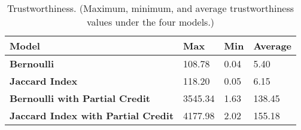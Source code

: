 \begin{table}[h!]
\centering
\footnotesize
{
\begin{tabular}{l|l|l|l}
\hline
Model                & Max     & Min & Average \\
\hline                            
{\bf Bernoulli}                    & 108.78   & 0.04 & 5.40 \\
{\bf Jaccard Index}                & 118.20   & 0.05 & 6.15 \\
{\bf Bernoulli with Partial Credit} & 3545.34  & 1.63 & 138.45 \\
{\bf Jaccard Index with Partial Credit} & 4177.98 & 2.02 & 155.18 \\
\hline
\end{tabular}
}
\caption{Trustworthiness. 
(Maximum, minimum, and average trustworthiness values under the four models.)
}
\label{tab:trust}
\end{table}
